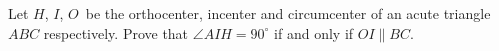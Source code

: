 \problem
Let $H$, $I$, $O$~be the orthocenter, incenter and circumcenter of an acute
triangle $ABC$ respectively.
Prove that $\angle AIH = 90^\circ$ if and only if $OI \parallel BC$.

\solution
\endproblem
